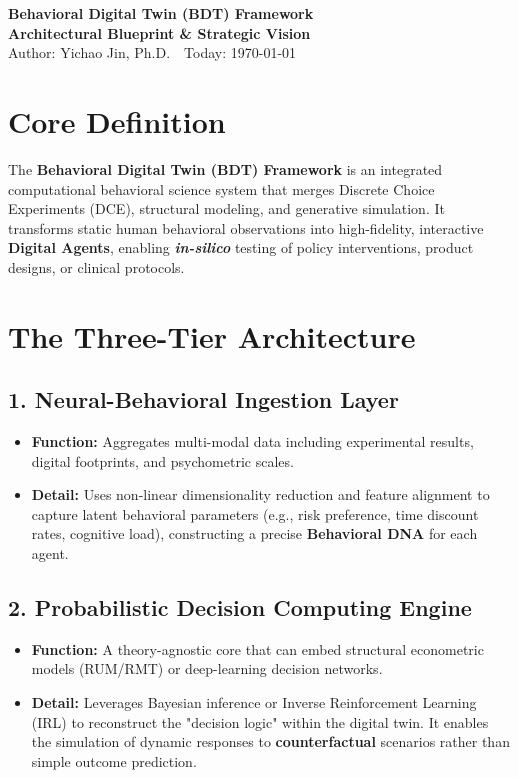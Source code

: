 \documentclass[11pt,a4paper]{article}
\newcommand{\docauthor}{Yichao Jin, Ph.D.}
\newcommand{\docdate}{\today}
\begin{document}
\begin{center}
    {\huge \bfseries \sffamily \color{slate} Behavioral Digital Twin (BDT) Framework} \\
    \vspace{0.3cm}
    {\large \bfseries \sffamily \color{teal} Architectural Blueprint \& Strategic Vision} \\
    \vspace{0.5cm}
    {\small \color{gray} Author: \docauthor \ \textbullet \ Today: \docdate}
\end{center}

\vspace{0.8cm}

\section*{Core Definition}
The \textbf{Behavioral Digital Twin (BDT) Framework} is an integrated computational behavioral science system that merges Discrete Choice Experiments (DCE), structural modeling, and generative simulation. It transforms static human behavioral observations into high-fidelity, interactive \textbf{Digital Agents}, enabling \textbf{\textit{in-silico}} testing of policy interventions, product designs, or clinical protocols.

\section*{The Three-Tier Architecture}

\subsection*{1. Neural-Behavioral Ingestion Layer}
\begin{itemize}[leftmargin=*, nosep]
    \item \textbf{Function:} Aggregates multi-modal data including experimental results, digital footprints, and psychometric scales.
    \item \textbf{Detail:} Uses non-linear dimensionality reduction and feature alignment to capture latent behavioral parameters (e.g., risk preference, time discount rates, cognitive load), constructing a precise \textbf{Behavioral DNA} for each agent.
\end{itemize}

\subsection*{2. Probabilistic Decision Computing Engine}
\begin{itemize}[leftmargin=*, nosep]
    \item \textbf{Function:} A theory-agnostic core that can embed structural econometric models (RUM/RMT) or deep-learning decision networks.
    \item \textbf{Detail:} Leverages Bayesian inference or Inverse Reinforcement Learning (IRL) to reconstruct the "decision logic" within the digital twin. It enables the simulation of dynamic responses to \textbf{counterfactual} scenarios rather than simple outcome prediction.
\end{itemize}
\end{document}
